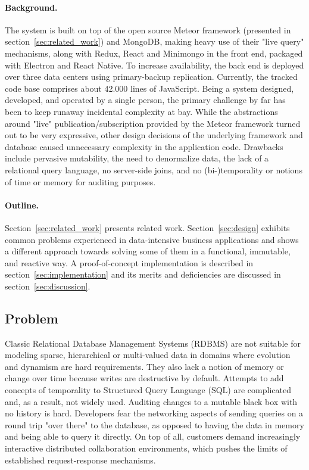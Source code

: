 \cleardoublepage

\paragraph{Background.} The system is built on top of the open source Meteor framework (presented in section~\ref{sec:related_work}) and MongoDB, making heavy use of their "live query" mechanisms, along with Redux, React and Minimongo in the front end, packaged with Electron and React Native. To increase availability, the back end is deployed over three data centers using primary-backup replication. Currently, the tracked code base comprises about 42.000 lines of JavaScript. Being a system designed, developed, and operated by a single person, the primary challenge by far has been to keep runaway incidental complexity at bay. While the abstractions around "live" publication/subscription provided by the Meteor framework turned out to be very expressive, other design decisions of the underlying framework and database caused unnecessary complexity in the application code. Drawbacks include pervasive mutability, the need to denormalize data, the lack of a relational query language, no server-side joins, and no (bi-)temporality or notions of time or memory for auditing purposes.


\paragraph{Outline.} Section~\ref{sec:related_work} presents related work. Section~\ref{sec:design} exhibits common problems experienced in data-intensive business applications and shows a different approach towards solving some of them in a functional, immutable, and reactive way. A proof-of-concept implementation is described in section~\ref{sec:implementation} and its merits and deficiencies are discussed in section~\ref{sec:discussion}.

\cleardoublepage

\subsection{Problem}
Classic Relational Database Management Systems (RDBMS) are not suitable for modeling sparse, hierarchical or multi-valued data in domains where evolution and dynamism are hard requirements. They also lack a notion of memory or change over time because writes are destructive by default. Attempts to add concepts of temporality to Structured Query Language (SQL) are complicated and, as a result, not widely used. Auditing changes to a mutable black box with no history is hard. Developers fear the networking aspects of sending queries on a round trip "over there" \cite{hickey2012dbvalue} to the database, as opposed to having the data in memory and being able to query it directly. On top of all, customers demand increasingly interactive distributed collaboration environments, which pushes the limits of established request-response mechanisms.

